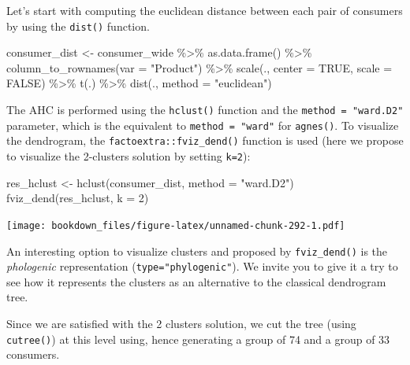 \documentclass[
]{krantz}
\makeatletter
\newenvironment{Shaded}{\begin{snugshade}}{\end{snugshade}}
\newcommand{\AttributeTok}[1]{\textcolor[rgb]{0.61,0.61,0.61}{#1}}
\newcommand{\ConstantTok}[1]{\textcolor[rgb]{0,0,0}{#1}}
\newcommand{\DecValTok}[1]{\textcolor[rgb]{0.06,0.06,0.06}{#1}}
\newcommand{\FunctionTok}[1]{\textcolor[rgb]{0,0,0}{#1}}
\newcommand{\NormalTok}[1]{#1}
\newcommand{\OtherTok}[1]{\textcolor[rgb]{0.37,0.37,0.37}{#1}}
\newcommand{\SpecialCharTok}[1]{\textcolor[rgb]{0,0,0}{#1}}
\newcommand{\StringTok}[1]{\textcolor[rgb]{0.5,0.5,0.5}{#1}}
\renewenvironment{quote}{\begin{VF}}{\end{VF}}
\newenvironment{kframe}{%
\medskip{}
\setlength{\fboxsep}{.8em}
 \def\at@end@of@kframe{}%
 \ifinner\ifhmode%
  \def\at@end@of@kframe{\end{minipage}}%
  \begin{minipage}{\columnwidth}%
 \fi\fi%
 \def\FrameCommand##1{\hskip\@totalleftmargin \hskip-\fboxsep
 \colorbox{shadecolor}{##1}\hskip-\fboxsep
     \hskip-\linewidth \hskip-\@totalleftmargin \hskip\columnwidth}%
 \MakeFramed {\advance\hsize-\width
   \@totalleftmargin\z@ \linewidth\hsize
   \@setminipage}}%
 {\par\unskip\endMakeFramed%
 \at@end@of@kframe}
\renewenvironment{Shaded}{\begin{kframe}}{\end{kframe}}
\makeatother
\begin{document}
Let's start with computing the euclidean distance between each pair of consumers by using the \texttt{dist()} function.

\begin{Shaded}
\begin{Highlighting}[]
\NormalTok{consumer\_dist }\OtherTok{\textless{}{-}}\NormalTok{ consumer\_wide }\SpecialCharTok{\%\textgreater{}\%}
  \FunctionTok{as.data.frame}\NormalTok{() }\SpecialCharTok{\%\textgreater{}\%}
  \FunctionTok{column\_to\_rownames}\NormalTok{(}\AttributeTok{var =} \StringTok{"Product"}\NormalTok{) }\SpecialCharTok{\%\textgreater{}\%}
  \FunctionTok{scale}\NormalTok{(., }\AttributeTok{center =} \ConstantTok{TRUE}\NormalTok{, }\AttributeTok{scale =} \ConstantTok{FALSE}\NormalTok{) }\SpecialCharTok{\%\textgreater{}\%}
  \FunctionTok{t}\NormalTok{(.) }\SpecialCharTok{\%\textgreater{}\%}
  \FunctionTok{dist}\NormalTok{(., }\AttributeTok{method =} \StringTok{"euclidean"}\NormalTok{)}
\end{Highlighting}
\end{Shaded}

The AHC is performed using the \texttt{hclust()} function and the \texttt{method\ =\ "ward.D2"} parameter, which is the equivalent to \texttt{method\ =\ "ward"} for \texttt{agnes()}. To visualize the dendrogram, the \texttt{factoextra::fviz\_dend()} function is used (here we propose to visualize the 2-clusters solution by setting \texttt{k=2}):

\begin{Shaded}
\begin{Highlighting}[]
\NormalTok{res\_hclust }\OtherTok{\textless{}{-}} \FunctionTok{hclust}\NormalTok{(consumer\_dist, }\AttributeTok{method =} \StringTok{"ward.D2"}\NormalTok{)}
\FunctionTok{fviz\_dend}\NormalTok{(res\_hclust, }\AttributeTok{k =} \DecValTok{2}\NormalTok{)}
\end{Highlighting}
\end{Shaded}

\texttt{[image: bookdown\_files/figure-latex/unnamed-chunk-292-1.pdf]}

\begin{quote}
An interesting option to visualize clusters and proposed by \texttt{fviz\_dend()} is the \emph{phologenic} representation (\texttt{type="phylogenic"}). We invite you to give it a try to see how it represents the clusters as an alternative to the classical dendrogram tree.
\end{quote}

Since we are satisfied with the 2 clusters solution, we cut the tree (using \texttt{cutree()}) at this level using, hence generating a group of 74 and a group of 33 consumers.
\end{document}
